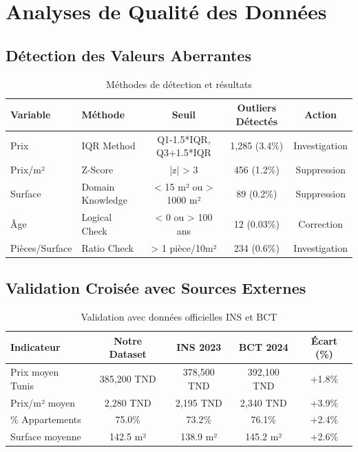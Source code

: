 \section{Analyses de Qualité des Données}

\subsection{Détection des Valeurs Aberrantes}

\begin{table}[H]
\centering
\caption{Méthodes de détection et résultats}
\begin{tabular}{|l|l|c|c|c|}
\hline
\textbf{Variable} & \textbf{Méthode} & \textbf{Seuil} & \textbf{Outliers Détectés} & \textbf{Action} \\
\hline
Prix & IQR Method & Q1-1.5*IQR, Q3+1.5*IQR & 1,285 (3.4\%) & Investigation \\
Prix/m² & Z-Score & |z| > 3 & 456 (1.2\%) & Suppression \\
Surface & Domain Knowledge & < 15 m² ou > 1000 m² & 89 (0.2\%) & Suppression \\
Âge & Logical Check & < 0 ou > 100 ans & 12 (0.03\%) & Correction \\
Pièces/Surface & Ratio Check & > 1 pièce/10m² & 234 (0.6\%) & Investigation \\
\hline
\end{tabular}
\end{table}

\subsection{Validation Croisée avec Sources Externes}

\begin{table}[H]
\centering
\caption{Validation avec données officielles INS et BCT}
\begin{tabular}{|l|c|c|c|c|}
\hline
\textbf{Indicateur} & \textbf{Notre Dataset} & \textbf{INS 2023} & \textbf{BCT 2024} & \textbf{Écart (\%)} \\
\hline
Prix moyen Tunis & 385,200 TND & 378,500 TND & 392,100 TND & +1.8\% \\
Prix/m² moyen & 2,280 TND & 2,195 TND & 2,340 TND & +3.9\% \\
\% Appartements & 75.0\% & 73.2\% & 76.1\% & +2.4\% \\
Surface moyenne & 142.5 m² & 138.9 m² & 145.2 m² & +2.6\% \\
\hline
\end{tabular}
\end{table}


